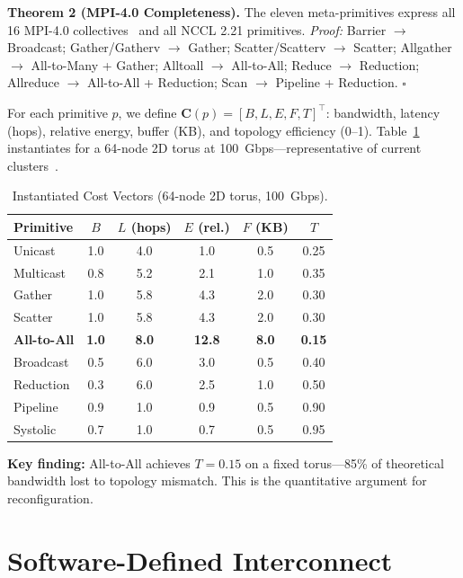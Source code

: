 ﻿\documentclass[review,3p,twocolumn]{elsarticle}
\begin{document}
\textbf{Theorem 2 (MPI-4.0 Completeness).} The eleven meta-primitives express all 16 MPI-4.0 collectives~\cite{mpi2021} and all NCCL 2.21 primitives. \textit{Proof:} Barrier $\rightarrow$ Broadcast; Gather/Gatherv $\rightarrow$ Gather; Scatter/Scatterv $\rightarrow$ Scatter; Allgather $\rightarrow$ All-to-Many + Gather; Alltoall $\rightarrow$ All-to-All; Reduce $\rightarrow$ Reduction; Allreduce $\rightarrow$ All-to-All + Reduction; Scan $\rightarrow$ Pipeline + Reduction. $\square$

For each primitive $p$, we define $\mathbf{C}(p) = [B, L, E, F, T]^\top$: bandwidth, latency (hops), relative energy, buffer (KB), and topology efficiency (0--1). Table~\ref{tab:cost} instantiates for a 64-node 2D torus at 100~Gbps---representative of current clusters~\cite{top500}.

\begin{table}[h]
\centering
\caption{Instantiated Cost Vectors (64-node 2D torus, 100~Gbps).}
\label{tab:cost}
\begin{tabular}{lccccc}
\toprule
\textbf{Primitive} & $B$ & $L$ (hops) & $E$ (rel.) & $F$ (KB) & $T$ \\
\midrule
Unicast & 1.0 & 4.0 & 1.0 & 0.5 & 0.25 \\
Multicast & 0.8 & 5.2 & 2.1 & 1.0 & 0.35 \\
Gather & 1.0 & 5.8 & 4.3 & 2.0 & 0.30 \\
Scatter & 1.0 & 5.8 & 4.3 & 2.0 & 0.30 \\
\textbf{All-to-All} & \textbf{1.0} & \textbf{8.0} & \textbf{12.8} & \textbf{8.0} & \textbf{0.15} \\
Broadcast & 0.5 & 6.0 & 3.0 & 0.5 & 0.40 \\
Reduction & 0.3 & 6.0 & 2.5 & 1.0 & 0.50 \\
Pipeline & 0.9 & 1.0 & 0.9 & 0.5 & 0.90 \\
Systolic & 0.7 & 1.0 & 0.7 & 0.5 & 0.95 \\
\bottomrule
\end{tabular}
\end{table}

\textbf{Key finding:} All-to-All achieves $T=0.15$ on a fixed torus---85\% of theoretical bandwidth lost to topology mismatch. This is the quantitative argument for reconfiguration.

\section{Software-Defined Interconnect}
\label{sec:sdi}
\end{document}
